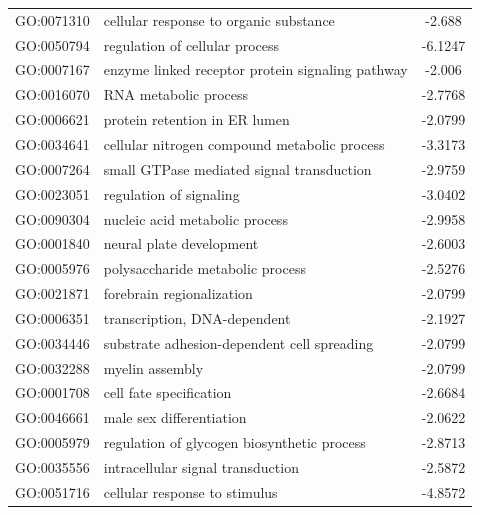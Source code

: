 \documentclass[11pt,twoside,a4paper]{report}
\begin{document}
\begin{appendices}
\begin{longtable}{@{\extracolsep{\fill}}llc@{}}
    GO:0071310 & cellular response to organic substance                      & -2.688        \\
    GO:0050794 & regulation of cellular process                              & -6.1247       \\
    GO:0007167 & enzyme linked receptor protein signaling pathway            & -2.006        \\
    GO:0016070 & RNA metabolic process                                       & -2.7768       \\
    GO:0006621 & protein retention in ER lumen                               & -2.0799       \\
    GO:0034641 & cellular nitrogen compound metabolic process                & -3.3173       \\
    GO:0007264 & small GTPase mediated signal transduction                   & -2.9759       \\
    GO:0023051 & regulation of signaling                                     & -3.0402       \\
    GO:0090304 & nucleic acid metabolic process                              & -2.9958       \\
    GO:0001840 & neural plate development                                    & -2.6003       \\
    GO:0005976 & polysaccharide metabolic process                            & -2.5276       \\
    GO:0021871 & forebrain regionalization                                   & -2.0799       \\
    GO:0006351 & transcription, DNA-dependent                                & -2.1927       \\
    GO:0034446 & substrate adhesion-dependent cell spreading                 & -2.0799       \\
    GO:0032288 & myelin assembly                                             & -2.0799       \\
    GO:0001708 & cell fate specification                                     & -2.6684       \\
    GO:0046661 & male sex differentiation                                    & -2.0622       \\
    GO:0005979 & regulation of glycogen biosynthetic process                 & -2.8713       \\
    GO:0035556 & intracellular signal transduction                           & -2.5872       \\
    GO:0051716 & cellular response to stimulus                               & -4.8572       \\

\end{longtable}
\end{appendices}
\end{document}
